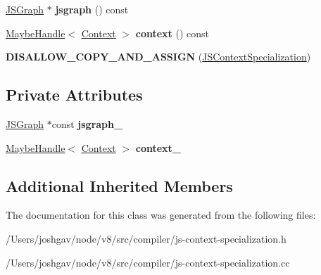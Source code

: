 \begin{DoxyCompactItemize}
\item 
\hyperlink{classv8_1_1internal_1_1compiler_1_1_j_s_graph}{J\+S\+Graph} $\ast$ {\bfseries jsgraph} () const \hypertarget{classv8_1_1internal_1_1compiler_1_1_j_s_context_specialization_a2d5f41dda6150ec4270ff4683274fcc6}{}\label{classv8_1_1internal_1_1compiler_1_1_j_s_context_specialization_a2d5f41dda6150ec4270ff4683274fcc6}

\item 
\hyperlink{classv8_1_1internal_1_1_maybe_handle}{Maybe\+Handle}$<$ \hyperlink{classv8_1_1internal_1_1_context}{Context} $>$ {\bfseries context} () const \hypertarget{classv8_1_1internal_1_1compiler_1_1_j_s_context_specialization_a4a129ebd339a3340f2cef49507ce1a3a}{}\label{classv8_1_1internal_1_1compiler_1_1_j_s_context_specialization_a4a129ebd339a3340f2cef49507ce1a3a}

\item 
{\bfseries D\+I\+S\+A\+L\+L\+O\+W\+\_\+\+C\+O\+P\+Y\+\_\+\+A\+N\+D\+\_\+\+A\+S\+S\+I\+GN} (\hyperlink{classv8_1_1internal_1_1compiler_1_1_j_s_context_specialization}{J\+S\+Context\+Specialization})\hypertarget{classv8_1_1internal_1_1compiler_1_1_j_s_context_specialization_ab0d31e893bb003844d10dcc4149b6d6d}{}\label{classv8_1_1internal_1_1compiler_1_1_j_s_context_specialization_ab0d31e893bb003844d10dcc4149b6d6d}

\end{DoxyCompactItemize}
\subsection*{Private Attributes}
\begin{DoxyCompactItemize}
\item 
\hyperlink{classv8_1_1internal_1_1compiler_1_1_j_s_graph}{J\+S\+Graph} $\ast$const {\bfseries jsgraph\+\_\+}\hypertarget{classv8_1_1internal_1_1compiler_1_1_j_s_context_specialization_a02262e90511de397eac23df1f7239c29}{}\label{classv8_1_1internal_1_1compiler_1_1_j_s_context_specialization_a02262e90511de397eac23df1f7239c29}

\item 
\hyperlink{classv8_1_1internal_1_1_maybe_handle}{Maybe\+Handle}$<$ \hyperlink{classv8_1_1internal_1_1_context}{Context} $>$ {\bfseries context\+\_\+}\hypertarget{classv8_1_1internal_1_1compiler_1_1_j_s_context_specialization_a19d51a9a246e4349972ced45a1cf5f7c}{}\label{classv8_1_1internal_1_1compiler_1_1_j_s_context_specialization_a19d51a9a246e4349972ced45a1cf5f7c}

\end{DoxyCompactItemize}
\subsection*{Additional Inherited Members}


The documentation for this class was generated from the following files\+:\begin{DoxyCompactItemize}
\item 
/\+Users/joshgav/node/v8/src/compiler/js-\/context-\/specialization.\+h\item 
/\+Users/joshgav/node/v8/src/compiler/js-\/context-\/specialization.\+cc\end{DoxyCompactItemize}
